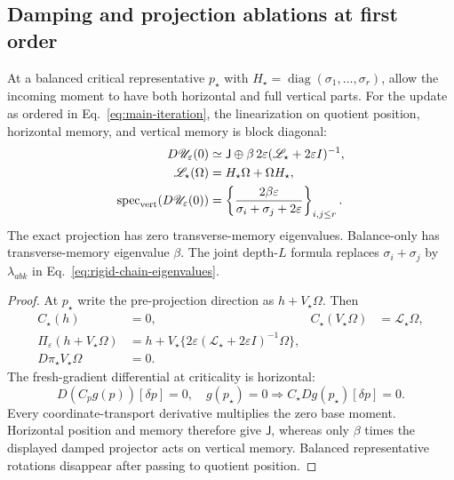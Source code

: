 \subsection{Damping and projection ablations at first order}
\begin{proposition}
\label{prop:local-damped-memory}
At a balanced critical representative $p_\star$ with
$H_\star=\operatorname{diag}(\sigma_1,\ldots,\sigma_r)$, allow the
incoming moment to have both horizontal and full vertical parts.
For the update as ordered in Eq.~\eqref{eq:main-iteration}, the
linearization on quotient position, horizontal memory, and vertical
memory is block diagonal:
\begin{align}
D\mathscr U_\varepsilon(0)
&\simeq
\mathsf J\oplus
\beta\,2\varepsilon(\mathscr L_\star+2\varepsilon I)^{-1},\\
\mathscr L_\star(\Omega)&=H_\star\Omega+\Omega H_\star,\\
\operatorname{spec}_{\rm vert}(D\mathscr U_\varepsilon(0))
&=\left\{\frac{2\beta\varepsilon}
{\sigma_i+\sigma_j+2\varepsilon}\right\}_{i,j\leq r}.
\label{eq:local-damped-memory}
\end{align}
The exact projection has zero transverse-memory eigenvalues.
Balance-only has transverse-memory eigenvalue $\beta$.
The joint depth-$L$ formula replaces $\sigma_i+\sigma_j$ by
$\lambda_{abk}$ in Eq.~\eqref{eq:rigid-chain-eigenvalues}.
\end{proposition}
\begin{proof}
At $p_\star$ write the pre-projection direction as $h+V_\star\Omega$.
Then
\begin{align}
C_\star(h)&=0,&
C_\star(V_\star\Omega)&=\mathscr L_\star\Omega,\\
\Pi_\varepsilon(h+V_\star\Omega)
&=h+V_\star\{2\varepsilon
(\mathscr L_\star+2\varepsilon I)^{-1}\Omega\},\\
D\pi_\star V_\star\Omega&=0 .
\end{align}
The fresh-gradient differential at criticality is horizontal:
\begin{equation}
D(C_pg(p))[\delta p]=0,\quad g(p_\star)=0
\Longrightarrow C_\star Dg(p_\star)[\delta p]=0 .
\end{equation}
Every coordinate-transport derivative multiplies the zero base
moment. Horizontal position and memory therefore give $\mathsf J$,
whereas only $\beta$ times the displayed damped projector acts on
vertical memory. Balanced representative rotations disappear after
passing to quotient position.
\end{proof}

